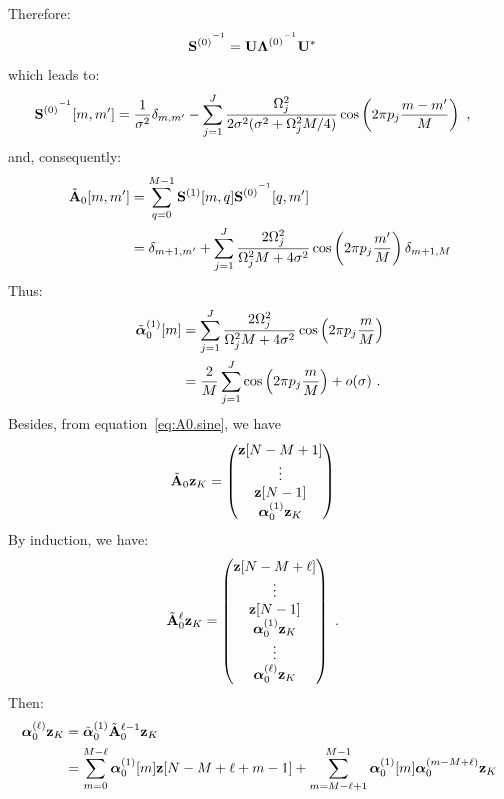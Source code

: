 \documentclass[journal, onecolumn]{IEEEtran}
\begin{document}
Therefore:
\begin{align*}
{{\mathbf S}^{(0)}}^{^{-1}}  &= {\mathbf U}{\boldsymbol{\Lambda}^{(0)}}^{^{-1}}{\mathbf U}^*
\end{align*}
which leads to:
\begin{align*}
{{\mathbf S}^{(0)}}^{^{-1}}[m,m']  &= \dfrac1{\sigma^2}\delta_{m,m'}-\sum_{j=1}^J\dfrac{\Omega_j^2}{2\sigma^2(\sigma^2+\Omega_j^2M/4)}\cos\left(2\pi p_j \dfrac{m-m'}{M}\right)\ ,
\end{align*}
and, consequently:
\begin{align}
\nonumber
\tilde\bA_0[m,m']  &= \sum_{q=0}^{M-1} {\bS^{(1)}}[m,q]{\bS^{(0)}}^\inv[q,m'] \\
&= \delta_{m+1,m'} + \sum_{j=1}^J\dfrac{2\Omega_j^2}{\Omega_j^2M+4\sigma^2}\cos\left(2\pi p_j\frac{m'}{M}\right)\delta_{m+1,M}
\label{eq:A0.sine}
\end{align}
Thus:
\begin{align*}
\tilde{\boldsymbol{\alpha}}_0^{(1)}[m]  &=\sum_{j=1}^J\dfrac{2\Omega_j^2}{\Omega_j^2M+4\sigma^2}\cos\left(2\pi p_j\frac{m}{M}\right) \\
&= \dfrac{2}{M}\sum_{j=1}^J\cos\left(2\pi p_j\frac{m}{M}\right) + o(\sigma)\ .
\end{align*}
Besides, from equation~\eqref{eq:A0.sine}, we have
\begin{align*}
\tilde{{\mathbf A}}_0{\mathbf z}_{K} &= 
\begin{pmatrix}
{\mathbf z}[N-M+1] \\
\vdots \\
{\mathbf z}[N-1] \\
\boldsymbol{\alpha}_0^{(1)}{\mathbf z}_K
\end{pmatrix}
\end{align*}
By induction, we have:
\begin{align*}
\tilde{{\mathbf A}}_0^{\ell}{\mathbf z}_{K} &= 
\begin{pmatrix}
{\mathbf z}[N-M+\ell] \\
\vdots \\
{\mathbf z}[N-1] \\
\boldsymbol{\alpha}_0^{(1)}{\mathbf z}_K \\
\vdots \\
\boldsymbol{\alpha}_0^{(\ell)}{\mathbf z}_K
\end{pmatrix}
\ .
\end{align*}
Then:
\begin{align}
\nonumber
\balpha_0^{(\ell)}\bz_{K} &= \tilde\balpha_0^{(1)}\tilde\bA_0^{\ell-1}\bz_{K} \\
&=\sum_{m=0}^{M-\ell}\balpha_0^{(1)}[m]\bz[N-M+\ell+m-1]+\sum_{m=M-\ell+1}^{M-1}\balpha_0^{(1)}[m]\balpha_0^{(m-M+\ell)}\bz_K
\label{eq:seq}
\end{align}
\end{document}

